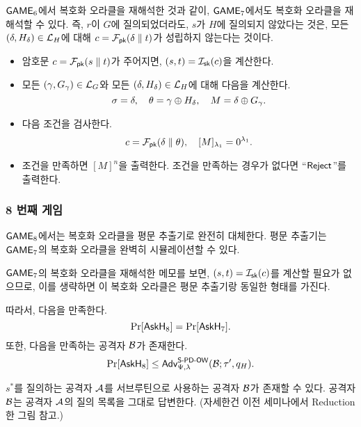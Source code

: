\begin{memo}
	$\textsf{GAME}_6$에서 복호화 오라클을 재해석한 것과 같이, $\textsf{GAME}_7$에서도 복호화
	오라클을 재해석할 수 있다. 즉, $r$이 $G$에 질의되었더라도, $s$가 $H$에
	질의되지 않았다는 것은, 모든 $(\delta, H_{\delta}) \in \mathcal{L}_H$에 대해 $c =
	\mathcal{F}_{\textsf{pk}}(\delta \parallel t)$가 성립하지 않는다는 것이다. 
	\begin{tcolorbox}
		\begin{itemize}
			\item 암호문 $c = \mathcal{F}_{\textsf{pk}}(s \parallel t)$가 주어지면, $(s,t) =
			\mathcal{I}_{\textsf{sk}}(c)$을 계산한다.
			\item 모든 $(\gamma, G_\gamma) \in \mathcal{L}_G$와 모든 $(\delta,
			H_{\delta}) \in \mathcal{L}_H$에 대해 다음을 계산한다.
			$$
				\sigma = \delta, \quad \theta = \gamma \oplus H_{\delta}, \quad M = \delta \oplus G_{\gamma}.
			$$
			\item 다음 조건을 검사한다.
			$$
				c = \mathcal{F}_{\textsf{pk}}(\delta \parallel \theta), \quad [M]_{\lambda_1} = 0^{\lambda_1}.
			$$
			\item 조건을 만족하면 $[M]^{n}$을 출력한다. 조건을 만족하는
			경우가 없다면 “$\textsf{Reject}$”를 출력한다.
		\end{itemize}
	\end{tcolorbox}
\end{memo}

\newpage
\subsubsection{8 번째 게임}

$\textsf{GAME}_8$에서는 복호화 오라클을 평문 추출기로 완전히 대체한다. 평문 추출기는
$\textsf{GAME}_7$의 복호화 오라클을 완벽히 시뮬레이션할 수 있다. 

\begin{memo}
	$\textsf{GAME}_7$의 복호화 오라클을 재해석한 메모를 보면, $(s, t) = \mathcal{I}_{\textsf{sk}}(c)$를
	계산할 필요가 없으므로, 이를 생략하면 이 복호화 오라클은 평문 추출기랑
	동일한 형태를 가진다.
\end{memo}

따라서, 다음을 만족한다.
$$
	\Pr[\textsf{AskH}_8] = \Pr[\textsf{AskH}_7].
$$
또한, 다음을 만족하는 공격자 $\mathcal{B}$가 존재한다.
$$
	\Pr[\textsf{AskH}_8] \leq \textsf{Adv}^{\textsf{S-PD-OW}}_{\Psi, \lambda}(\mathcal{B}; \tau', q_{H}).
$$

\begin{memo}
	$s^*$를 질의하는 공격자 $\mathcal{A}$를 서브루틴으로 사용하는 공격자 $\mathcal{B}$가
	존재할 수 있다. 공격자 $\mathcal{B}$는 공격자 $\mathcal{A}$의 질의 목록을 그대로 답변한다.
	(자세한건 이전 세미나에서 Reduction한 그림 참고.)
\end{memo}

